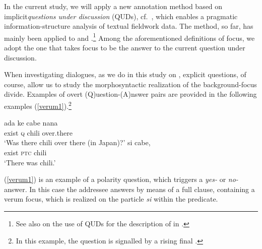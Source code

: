 \documentclass[output=paper
,modfonts
,nonflat]{langsci/langscibook}
\begin{document}
In the current study, we will apply a new annotation method based on implicit\linebreak \textit{questions under discussion} (QUDs), cf.\ \citet{stuch89, kupja95, robcr12, beada17}, which enables a pragmatic information-structure analysis of textual fieldwork data. The method, so far, has mainly been applied to  and  \citep[e.g.][]{riear18}.\footnote{See also  on the use of QUDs for the description of  in .}
Among the aforementioned definitions of focus, we adopt the one that takes focus to be the answer to the current question under discussion.

When investigating dialogues, as we do in this study on , explicit questions, of course, allow us to study the morphosyntactic realization of the background-focus divide. Examples of overt (Q)uestion-(A)nswer pairs are provided in the following  examples (\ref{verum1}).\footnote{In this example, the question is signalled by a rising final .}

\begin{exe}
	\ex\label{verum1}
	\begin{xlist}[Q\textsubscript{{7}}:]
		\gll ada ke cabe nana\\
		exist \textsc{q} chili over.there\\
		\glt `Was there chili over there (in Japan)?'
			{{\ob}si{\cb}\focus} {{\ob}cabe,{\cb}\topic{\cb}\sq}\\
		\hphantom{[}exist \textsc{ptc} \hphantom{[}chili\\
		\glt `There was chili.'
	\end{xlist}
\end{exe}

\noindent (\ref{verum1}) is an example of a polarity question, which triggers a \textit{yes-} or \textit{no-}answer. In this case the addressee answers by means of a full clause, containing a verum focus, which is realized on the particle \textit{si} within the predicate.
\end{document}
